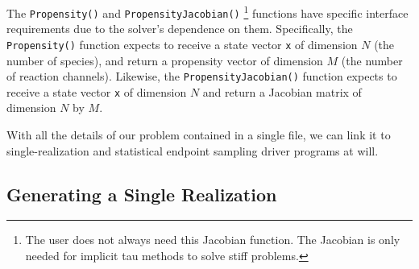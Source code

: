 \documentclass[12pt]{article}
\newcommand{\api}[1]{\texttt{#1}}
\begin{document}
The \api{Propensity()} and \api{PropensityJacobian()}
\footnote{The user does not always need this Jacobian function. The Jacobian
is only needed for implicit tau methods to solve stiff problems. } functions have
specific interface requirements due to the solver's dependence on
them.  Specifically, the \api{Propensity()} function expects to
receive a state vector \api{x} of dimension $N$ (the number of species),
and return  a propensity vector of dimension $M$ (the number of reaction channels).
Likewise, the \api{PropensityJacobian()} function expects to receive a
state vector \api{x} of dimension $N$ and return a Jacobian matrix of dimension
$N$ by $M$.

With all the details of our problem contained in a single file, we can
link it to single-realization and statistical endpoint sampling driver
programs at will.

\subsection{Generating a Single Realization}
\end{document}
